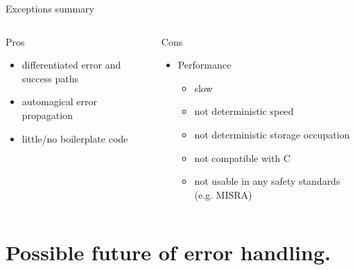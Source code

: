 \documentclass[10pt]{beamer}
\begin{document}


\begin{frame}{Exceptions summary}
	\begin{columns}[T]
		\begin{column}{0.48\linewidth}
			Pros
			\begin{itemize}
				\item differentiated error and success paths
				\item automagical error propagation
				\item little/no boilerplate code
			\end{itemize}
		\end{column}
	\begin{column}{0.48\linewidth}
			Cons
			\begin{itemize}
				\item Performance
				\begin{itemize}
					\item slow
					\item not deterministic speed
					\item not deterministic storage occupation
					\item not compatible with C
					\item not usable in any safety standards (e.g. MISRA)
				\end{itemize}
			\end{itemize}
	\end{column}
	\end{columns}
\end{frame}

\section{Possible future of error handling.}
\end{document}
